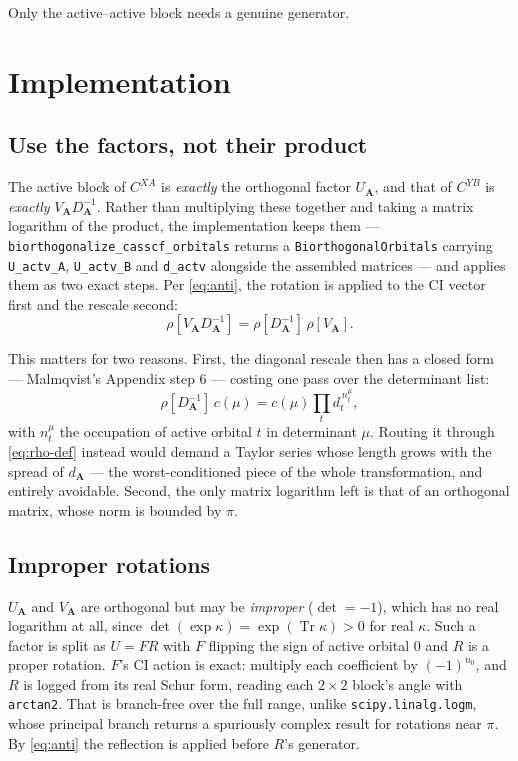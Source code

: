 \documentclass[aip,jcp,preprint]{revtex4-1}
\newcommand{\Tr}{\operatorname{Tr}}
\begin{document}
Only the active--active block needs a genuine generator.

\section{Implementation}
\label{sec:impl}

\subsection{Use the factors, not their product}

The active block of $C^{XA}$ is \emph{exactly} the orthogonal factor $U_{\mathbf{A}}$,
and that of $C^{YB}$ is \emph{exactly} $V_{\mathbf{A}} D_{\mathbf{A}}^{-1}$. Rather than
multiplying these together and taking a matrix logarithm of the product, the
implementation keeps them --- \texttt{biorthogonalize\_casscf\_orbitals}
returns a \texttt{BiorthogonalOrbitals} carrying \texttt{U\_actv\_A},
\texttt{U\_actv\_B} and \texttt{d\_actv} alongside the assembled matrices ---
and applies them as two exact steps. Per \cref{eq:anti}, the rotation is
applied to the CI vector first and the rescale second:
\begin{equation}
 \rho[V_{\mathbf{A}} D_{\mathbf{A}}^{-1}] = \rho[D_{\mathbf{A}}^{-1}]\,\rho[V_{\mathbf{A}}].
\end{equation}

This matters for two reasons. First, the diagonal rescale then has a closed
form --- Malmqvist's Appendix step 6 --- costing one pass over the determinant
list:
\begin{equation}
 \rho[D_{\mathbf{A}}^{-1}]\,c(\mu) = c(\mu) \prod_t d_t^{\,n_t^\mu},
 \label{eq:diag-closed}
\end{equation}
with $n_t^\mu$ the occupation of active orbital $t$ in determinant $\mu$.
Routing it through \cref{eq:rho-def} instead would demand a Taylor series
whose length grows with the spread of $d_{\mathbf{A}}$ --- the worst-conditioned piece of
the whole transformation, and entirely avoidable. Second, the only matrix
logarithm left is that of an orthogonal matrix, whose norm is bounded by
$\pi$.

\subsection{Improper rotations}

$U_{\mathbf{A}}$ and $V_{\mathbf{A}}$ are orthogonal but may be \emph{improper}
($\det = -1$), which has no real logarithm at all, since
$\det(\exp\kappa)=\exp(\Tr\kappa)>0$ for real $\kappa$. Such a factor is split
as $U = FR$ with $F$ flipping the sign of active orbital 0 and $R$ is a proper rotation.
$F$'s CI action is exact: multiply each coefficient by
$(-1)^{n_0}$, and $R$ is logged from its real Schur form, reading each
$2\times2$ block's angle with \texttt{arctan2}. That is branch-free over the
full range, unlike \texttt{scipy.linalg.logm}, whose principal branch returns
a spuriously complex result for rotations near $\pi$. By \cref{eq:anti} the
reflection is applied before $R$'s generator.
\end{document}
